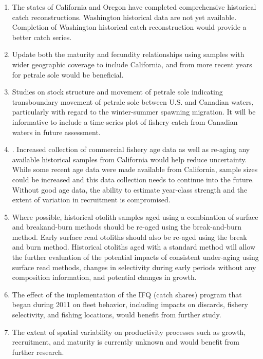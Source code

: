 \documentclass[12pt,]{article}
\begin{document}
\begin{enumerate}

\item The states of California and Oregon have completed comprehensive historical catch reconstructions. Washington historical data are not yet available. Completion of Washington historical catch reconstruction would provide a better catch series.

\item Update both the maturity and fecundity relationships using samples with wider geographic coverage to include California, and from more recent years for petrale sole would be beneficial. 

\item Studies on stock structure and movement of petrale sole indicating transboundary movement of petrale sole between U.S. and Canadian waters, particularly with regard to the winter-summer spawning migration. It will be informative to include a time-series plot of fishery catch from Canadian waters in future assessment.

\item . Increased collection of commercial fishery age data as well as re-aging any available historical samples from California would help reduce uncertainty. While some recent age data were made available from California, sample sizes could be increased and this data collection needs to continue into the future. Without good age data, the ability to estimate year-class strength and the extent of variation in recruitment is compromised.

\item Where possible, historical otolith samples aged using a combination of surface and breakand-burn methods should be re-aged using the break-and-burn method. Early surface read otoliths should also be re-aged using the break and burn method. Historical otoliths aged with a standard method will allow the further evaluation of the potential impacts of consistent under-aging using surface read methods, changes in selectivity during early periods without any composition information, and potential changes in growth.

\item The effect of the implementation of the IFQ (catch shares) program that began during 2011 on fleet behavior, including impacts on discards, fishery selectivity, and fishing locations, would benefit from further study.

\item The extent of spatial variability on productivity processes such as growth, recruitment, and maturity is currently unknown and would benefit from further research. 


\end{enumerate}
\end{document}

